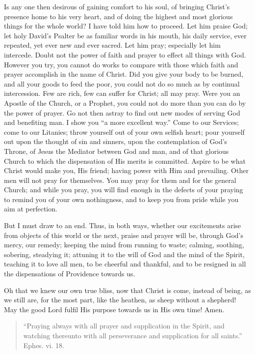 Is any one then desirous of gaining comfort to his soul, of
bringing Christ's presence home to his very heart, and of doing the
highest and most glorious things for the whole world? I have told him
how to proceed. Let him praise God; let holy David's Psalter be as
familiar words in his mouth, his daily service, ever repeated, yet
ever new and ever sacred. Let him pray; especially let him intercede.
Doubt not the power of faith and prayer to effect all things with God.
However you try, you cannot do works to compare with those which faith
and prayer accomplish in the name of Christ. Did you give your body to
be burned, and all your goods to feed the poor, you could not do so
much as by continual intercession. Few are rich, few can suffer for
Christ; all may pray. Were you an Apostle of the Church, or a Prophet,
you could not do more than you can do by the power of prayer. Go not
then astray to find out new modes of serving God and benefiting man. I
show you ``a more excellent way.'' Come to our Services; come
to our Litanies; throw yourself out of your own selfish heart; pour
yourself out upon the thought of sin and sinners, upon the
contemplation of God's Throne, of Jesus the Mediator between God and
man, and of that glorious Church to which the dispensation of His
merits is committed. Aspire to be what Christ would make you, His
friend; having power with Him and prevailing. Other men will not pray
for themselves. You may pray for them and for the general Church; and
while you pray, you will find enough in the defects of your praying to
remind you of your own nothingness, and to keep you from pride while
you aim at perfection.

But I must draw to an end. Thus, in both ways, whether our
excitements arise from objects of this world or the next, praise and
prayer will be, through God's mercy, our remedy; keeping the mind from
running to waste; calming, soothing, sobering, steadying it; attuning
it to the will of God and the mind of the Spirit, teaching it to love
all men, to be cheerful and thankful, and to be resigned in all the
dispensations of Providence towards us.

Oh that we knew our own true bliss, now that Christ is come,
instead of being, as we still are, for the most part, like the
heathen, as sheep without a shepherd! May the good Lord fulfil His
purpose towards us in His own time! Amen.


\begin{quote}

``Praying always with all prayer and supplication in the
Spirit, and watching thereunto with all perseverance and
supplication for all saints.'' Ephes. vi. 18.

\end{quote}

